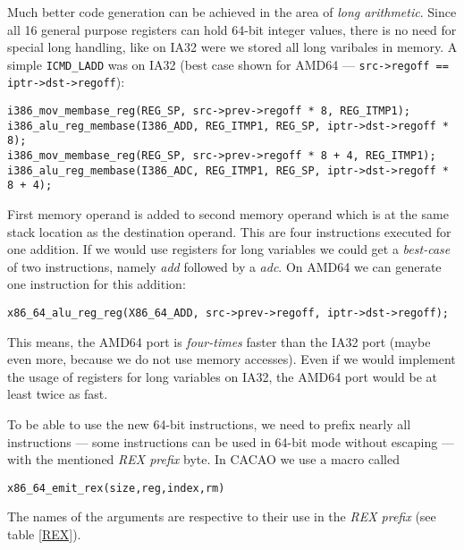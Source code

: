 Much better code generation can be achieved in the area of
\textit{long arithmetic}. Since all 16 general purpose registers can
hold 64-bit integer values, there is no need for special long
handling, like on IA32 were we stored all long varibales in memory. A
simple \texttt{ICMD\_LADD} was on IA32 (best case shown for AMD64 ---
\texttt{src->regoff == iptr->dst->regoff}):

\begin{verbatim}
i386_mov_membase_reg(REG_SP, src->prev->regoff * 8, REG_ITMP1);
i386_alu_reg_membase(I386_ADD, REG_ITMP1, REG_SP, iptr->dst->regoff * 8);
i386_mov_membase_reg(REG_SP, src->prev->regoff * 8 + 4, REG_ITMP1);
i386_alu_reg_membase(I386_ADC, REG_ITMP1, REG_SP, iptr->dst->regoff * 8 + 4);
\end{verbatim}

First memory operand is added to second memory operand which is at the
same stack location as the destination operand. This are four
instructions executed for one addition. If we would use registers for
long variables we could get a \textit{best-case} of two instructions,
namely \textit{add} followed by a \textit{adc}. On AMD64 we can
generate one instruction for this addition:

\begin{verbatim}
x86_64_alu_reg_reg(X86_64_ADD, src->prev->regoff, iptr->dst->regoff);
\end{verbatim}

This means, the AMD64 port is \textit{four-times} faster than the IA32
port (maybe even more, because we do not use memory accesses). Even if
we would implement the usage of registers for long variables on IA32,
the AMD64 port would be at least twice as fast.

To be able to use the new 64-bit instructions, we need to prefix
nearly all instructions --- some instructions can be used in 64-bit
mode without escaping --- with the mentioned \textit{REX prefix}
byte. In CACAO we use a macro called

\begin{verbatim}
x86_64_emit_rex(size,reg,index,rm)
\end{verbatim}

The names of the arguments are respective to their use in the
\textit{REX prefix} (see table \ref{REX}).
